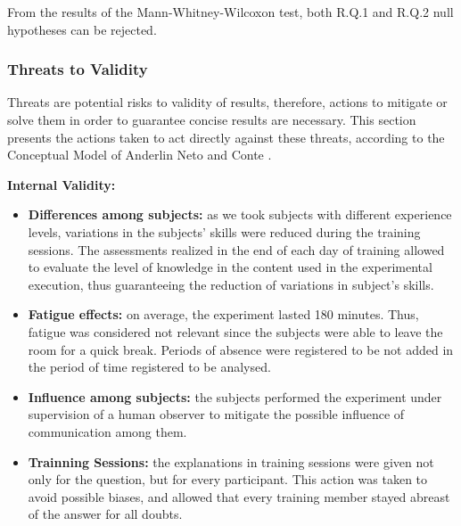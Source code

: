 From the results of the Mann-Whitney-Wilcoxon test, both R.Q.1 and R.Q.2 null hypotheses can be rejected.



\subsubsection{Threats to Validity}\label{sec:threats}

Threats are potential risks to validity of results, therefore, actions to mitigate or solve them in order to guarantee concise results are necessary. This section presents the actions taken to act directly against these threats, according to the Conceptual Model of Anderlin Neto and Conte \cite{neto13}.

\textbf{Internal Validity:} %

\begin{itemize}
\item \textbf{Differences among subjects:} as we took subjects with different experience levels, variations in the subjects' skills were reduced during the training sessions. The assessments realized in the end of each day of training allowed to evaluate the level of knowledge in the content used in the experimental execution, thus guaranteeing the reduction of variations in subject's skills.

\item \textbf{Fatigue effects:} on average, the experiment lasted 180 minutes. Thus, fatigue was considered not relevant since the subjects were able to leave the room for a quick break. Periods of absence were registered to be not added in the period of time registered to be analysed.

\item \textbf{Influence among subjects:} the subjects performed the experiment under supervision of a human observer to mitigate the possible influence of communication among them.

\item \textbf{Trainning Sessions:} the explanations in training sessions were given not only for the question, but for every participant. This action was taken to avoid possible biases, and allowed that every training member stayed abreast of the answer for all doubts.
\end{itemize}


